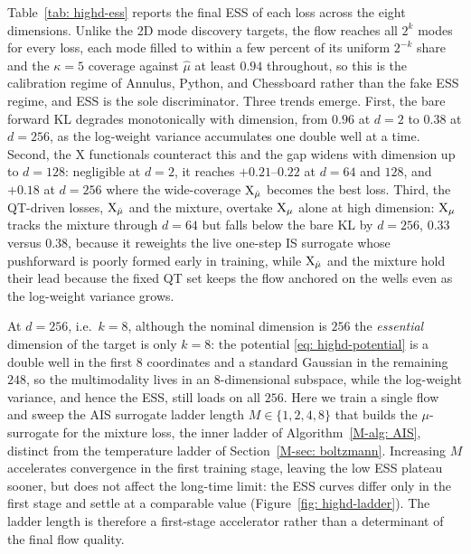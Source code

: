 \documentclass{article}
\begin{document}
Table~\ref{tab: highd-ess} reports the final ESS of each loss across the eight dimensions. Unlike the 2D mode discovery targets, the flow reaches all $2^k$ modes for every loss, each mode filled to within a few percent of its uniform $2^{-k}$ share and the $\kappa = 5$ coverage against $\hat\mu$ at least $0.94$ throughout, so this is the calibration regime of Annulus, Python, and Chessboard rather than the fake ESS regime, and ESS is the sole discriminator. Three trends emerge. First, the bare forward KL degrades monotonically with dimension, from $0.96$ at $d = 2$ to $0.38$ at $d = 256$, as the log-weight variance accumulates one double well at a time. Second, the X functionals counteract this and the gap widens with dimension up to $d = 128$: negligible at $d = 2$, it reaches $+0.21$--$0.22$ at $d = 64$ and $128$, and $+0.18$ at $d = 256$ where the wide-coverage $\mathrm{X}_{\hat\mu}$ becomes the best loss. Third, the QT-driven losses, $\mathrm{X}_{\hat\mu}$ and the mixture, overtake $\mathrm{X}_\mu$ alone at high dimension: $\mathrm{X}_\mu$ tracks the mixture through $d = 64$ but falls below the bare KL by $d = 256$, $0.33$ versus $0.38$, because it reweights the live one-step IS surrogate whose pushforward is poorly formed early in training, while $\mathrm{X}_{\hat\mu}$ and the mixture hold their lead because the fixed QT set keeps the flow anchored on the wells even as the log-weight variance grows.

At $d = 256$, i.e.\ $k = 8$, although the nominal dimension is $256$ the \emph{essential} dimension of the target is only $k = 8$: the potential \eqref{eq: highd-potential} is a double well in the first $8$ coordinates and a standard Gaussian in the remaining $248$, so the multimodality lives in an $8$-dimensional subspace, while the log-weight variance, and hence the ESS, still loads on all $256$. Here we train a single flow and sweep the AIS surrogate ladder length $M \in \{1, 2, 4, 8\}$ that builds the $\mu$-surrogate for the mixture loss, the inner ladder of Algorithm~\ref{M-alg: AIS}, distinct from the temperature ladder of Section~\ref{M-sec: boltzmann}. Increasing $M$ accelerates convergence in the first training stage, leaving the low ESS plateau sooner, but does not affect the long-time limit: the ESS curves differ only in the first stage and settle at a comparable value (Figure~\ref{fig: highd-ladder}). The ladder length is therefore a first-stage accelerator rather than a determinant of the final flow quality.
\end{document}
